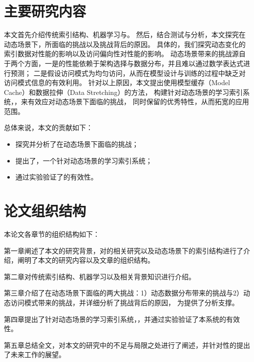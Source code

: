 \section{主要研究内容}

本文首先介绍传统索引结构、机器学习与{\li}。
然后，结合测试与分析，本文探究在动态场景下，{\li}所面临的挑战以及挑战背后的原因。
具体的，我们探究动态变化的索引数据对{\li}性能的影响以及访问偏向性对{\li}性能的影响。
动态场景带来的挑战源自于两个方面，一是{\li}的性能依赖于架构选择与数据分布，并且难以通过数学表达式进行预测；
二是{\li}假设访问模式为均匀访问，从而在模型设计与训练的过程中缺乏对访问模式信息的有效利用。
针对以上原因，本文提出使用模型缓存（Model Cache）和数据拉伸（Data Stretching）的方法，
构建针对动态场景的学习索引系统，{\sys}，来有效应对动态场景下{\li}面临的挑战，
同时保留{\li}的优秀特性，从而拓宽{\li}的应用范围。

总体来说，本文的贡献如下：
\begin{itemize}
  \item 探究并分析了{\li}在动态场景下面临的挑战；
  \item 提出了{\sys}，一个针对动态场景的学习索引系统；
  \item 通过实验验证了{\sys}的有效性。
\end{itemize}

\section{论文组织结构}

本论文各章节的组织结构如下：

第一章阐述了本文的研究背景，对{\li}的相关研究以及动态场景下的索引结构进行了介绍，阐明了本文的研究内容以及文章的组织结构。

第二章对传统索引结构、机器学习以及{\li}相关背景知识进行介绍。

第三章介绍了在动态场景下{\li}面临的两大挑战：1）动态数据分布带来的挑战与2）动态访问模式带来的挑战，并详细分析了挑战背后的原因，
为{\sys}提供了分析支撑。

第四章提出了针对动态场景的学习索引系统，{\sys}，并通过实验验证了本系统的有效性。

第五章总结全文，对本文的研究中的不足与局限之处进行了阐述，并针对性的提出了未来工作的展望。
